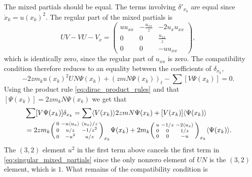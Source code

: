 \documentclass[english,master]{liumaiex}
\theoremstyle{thesisplain}
\theoremstyle{thesisdefinition}
\numberwithin{equation}{section}
\begin{document}
The mixed partials should be equal. The terms involving $\delta'_{x_k}$ are equal since $\dot{x}_k = u(x_k)^2$. The regular part of the mixed partials is
\begin{equation}
	UV - VU - V_x =
	\begin{pmatrix}
		u u_{xx} & -\frac{u_{xx}}{z} & -2 u_x u_{xx} \\
		0 & 0 & \frac{u_{xx}}{z} \\
		0 & 0 & -u u_{xx}
	\end{pmatrix},
\end{equation}
which is identically zero, since the regular part of $u_{xx}$ is zero. The compatibility condition therefore reduces to an equality between the coefficients of $\delta_{x_k}$,
\begin{equation} \label{eq:singular_mixed_partials}
	-2zm_ku(x_k)^2UN\Psi(x_k) + (zmN \Psi(x_k))_t - \sum [V \Psi(x_k)] = 0.
\end{equation}
Using the product rule \eqref{eq:dirac_product_rules} and that $[\Psi(x_k)] = 2zm_kN\Psi(x_k)$ we get that
\begin{equation}
\begin{aligned}
	&\sum [V \Psi(x_k)] \delta_{x_k} 
	= \sum \langle V(x_k) \rangle 2zmN\Psi(x_k) + [V(x_k)]\langle \Psi(x_k) \rangle \\
	&= 2zm_k
	\begin{psmallmatrix}
		0 & -u\langle u_x \rangle & \langle u_x \rangle/z \\
		0 & u/z & -1/z^2 \\
		0 & -u^2 & u/z \\
	\end{psmallmatrix}_{x_k} \Psi(x_k)
	+2m_k
	\begin{psmallmatrix}
		u & -1/z & -2\langle u_x \rangle \\
		0 & 0 & 1/z \\
		0 & 0 & -u \\
	\end{psmallmatrix}_{x_k} \langle \Psi(x_k) \rangle.
\end{aligned}
\end{equation}
The $(3,2)$ element $u^2$ in the first term above cancels the first term in \eqref{eq:singular_mixed_partials} since the only nonzero element of $UN$ is the $(3,2)$ element, which is $1$. What remains of the compatibility condition is
\end{document}

